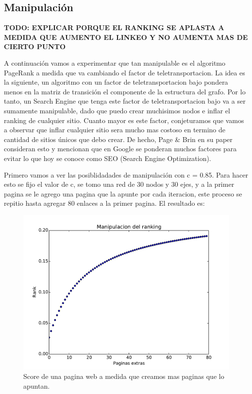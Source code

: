 \pagebreak
\subsection{Manipulación}

\textbf{TODO: EXPLICAR PORQUE EL RANKING SE APLASTA A MEDIDA QUE AUMENTO EL LINKEO Y NO AUMENTA MAS DE CIERTO PUNTO}

A continuación vamos a experimentar que tan manipulable es el algoritmo PageRank a medida que va cambiando el factor de teletransportacion. La idea es la siguiente, un algoritmo con un factor de teletransportacion bajo pondera menos en la matriz de transición el componente de la estructura del grafo. Por lo tanto, un Search Engine que tenga este factor de teletransportacion bajo va a ser sumamente manipulable, dado que puedo crear muchisimos nodos e inflar el ranking de cualquier sitio. Cuanto mayor es este factor, conjeturamos que vamos a observar que inflar cualquier sitio sera mucho mas costoso en termino de cantidad de sitios únicos que debo crear. De hecho, Page \& Brin en su paper consideran esto y mencionan que en Google se ponderan muchos factores para evitar lo que hoy se conoce como SEO (Search Engine Optimization).

Primero vamos a ver las posiblidadades de manipulación con c = 0.85. Para hacer esto se fijo el valor de c, se tomo una red de 30 nodos y 30 ejes, y a la primer pagina se le agrego una pagina que la apunte por cada iteracion, este proceso se repitio hasta agregar 80 enlaces a la primer pagina. El resultado es:

\begin{figure}[H]
\centering
\includegraphics[scale=0.7]{images/manipulacion.pdf}
\caption{Score de una pagina web a medida que creamos mas paginas que lo apuntan.}
\label{timePageRank}
\end{figure}

